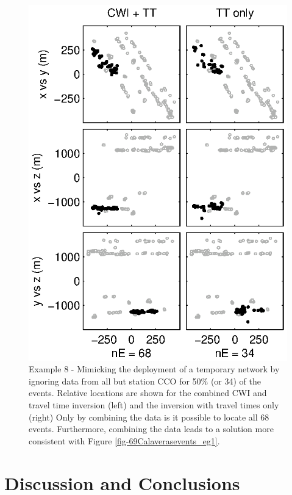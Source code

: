 \documentclass[extra, onecolumn, doublespacing]{gji}
\begin{document}
\begin{figure}
\includegraphics{diags/CalaverasLoc6_hypoDD_SVD.eps}
\caption{Example 8 - Mimicking the deployment of a temporary network
by ignoring data from all but station CCO for 50\% (or 34) of the
events. Relative locations are shown for the combined CWI and travel
time inversion (left) and the inversion with travel times only
(right) Only by combining the data is it possible to locate all 68
events. Furthermore, combining the data leads to a solution more
consistent with Figure \ref{fig-69Calaverasevents_eg1}. }
\label{fig-68Calaverasevents_ttsubsetandcoda1}
\end{figure}



\section{Discussion and Conclusions}
\end{document}
